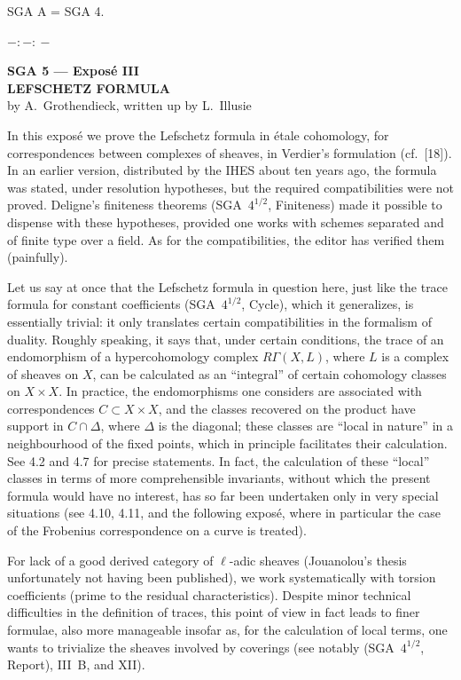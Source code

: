 \documentclass[11pt]{article}
\begin{document}
SGA A = SGA 4.

\begin{center}
$-:\!-:\!-$
\end{center}

\clearpage
{}
\begin{center}
{\Large \textbf{SGA 5 --- Exposé III}}\\[0.4em]
{\large \textbf{LEFSCHETZ FORMULA}}\\[0.3em]
by A.~Grothendieck, written up by L.~Illusie
\end{center}

In this exposé we prove the Lefschetz formula in étale cohomology, for correspondences between complexes of sheaves, in Verdier's formulation (cf.~[18]). In an earlier version, distributed by the IHES about ten years ago, the formula was stated, under resolution hypotheses, but the required compatibilities were not proved. Deligne's finiteness theorems (SGA~$4^{1/2}$, Finiteness) made it possible to dispense with these hypotheses, provided one works with schemes separated and of finite type over a field. As for the compatibilities, the editor has verified them (painfully).

Let us say at once that the Lefschetz formula in question here, just like the trace formula for constant coefficients (SGA~$4^{1/2}$, Cycle), which it generalizes, is essentially trivial: it only translates certain compatibilities in the formalism of duality. Roughly speaking, it says that, under certain conditions, the trace of an endomorphism of a hypercohomology complex $R\Gamma(X,L)$, where $L$ is a complex of sheaves on $X$, can be calculated as an ``integral'' of certain cohomology classes on $X\times X$. In practice, the endomorphisms one considers are associated with correspondences $C\subset X\times X$, and the classes recovered on the product have support in $C\cap\Delta$, where $\Delta$ is the diagonal; these classes are ``local in nature'' in a neighbourhood of the fixed points, which in principle facilitates their calculation. See 4.2 and 4.7 for precise statements. In fact, the calculation of these ``local'' classes in terms of more comprehensible invariants, without which the present formula would have no interest, has so far been undertaken only in very special situations (see 4.10, 4.11, and the following exposé, where in particular the case of the Frobenius correspondence on a curve is treated).

For lack of a good derived category of $\ell$-adic sheaves (Jouanolou's thesis unfortunately not having been published), we work systematically with torsion coefficients (prime to the residual characteristics). Despite minor technical difficulties in the definition of traces, this point of view in fact leads to finer formulae, also more manageable insofar as, for the calculation of local terms, one wants to trivialize the sheaves involved by coverings (see notably (SGA~$4^{1/2}$, Report), III~B, and XII).
\end{document}
